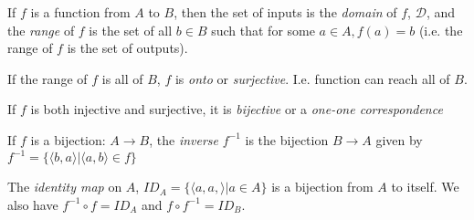 \begin{definition}
	If $f$ is a function from $A$ to $B$, then the set of inputs is the \textit{domain}
	of $f$, $\mathcal{D}$, and the \textit{range} of $f$ is the set of all $b \in B$
	such that for some $a \in A, f(a) = b$ (i.e. the range of $f$ is the set of
	outputs).
\end{definition}

\begin{definition}
	If the range of $f$ is all of $B$, $f$ is \textit{onto} or
	\textit{surjective}. I.e. function can reach all of $B$.
\end{definition}

\begin{definition}
	If $f$ is both injective and surjective, it is \textit{bijective} or a
	\textit{one-one correspondence}
\end{definition}

\begin{definition}[Inverse $f^{-1}$]
	If $f$ is a bijection: $A \to B$, the \textit{inverse} $f^{-1}$ is
	the bijection $B \to A$ given by $f^{-1} = \{ \langle b,a \rangle | \langle
		a,b \rangle \in f\}$
\end{definition}
\begin{definition}
	The \textit{identity map} on $A$, $ID_A = \{\langle a,a, \rangle
		| a \in A\}$ is a bijection from $A$ to itself.
	We also have $f^{-1} \circ f = ID_A$ and $f \circ f^{-1} = ID_B$.
\end{definition}

